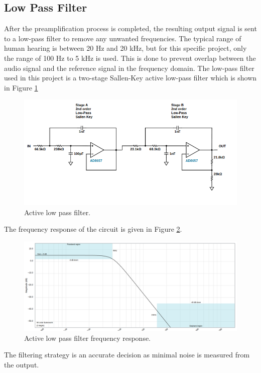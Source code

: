 \documentclass[a4paper,10pt]{IEEEtran}
\begin{document}
\subsection{Low Pass Filter}
After the preamplification process is completed, the resulting output signal is sent to a low-pass filter to remove any unwanted frequencies. The typical range of human hearing is between 20 Hz and 20 kHz, but for this specific project, only the range of 100 Hz to 5 kHz is used. This is done to prevent overlap between the audio signal and the reference signal in the frequency domain. The low-pass filter used in this project is a two-stage Sallen-Key active low-pass filter which is shown in Figure \ref{lowpass}
\begin{figure}[htbp!]
    \centering
    \includegraphics[width = 1\linewidth]{active_low_pass_circuit.png}
    \caption{Active low pass filter.}
    \label{lowpass}
\end{figure} 
The frequency response of the circuit is given in Figure \ref{lowpass_resp}.
\begin{figure}[htbp!]
    \centering
    \includegraphics[width = 1\linewidth]{active_low_pass.png}
    \caption{Active low pass filter frequency response.}
    \label{lowpass_resp}
\end{figure} 
The filtering strategy is an accurate decision as minimal noise is measured from the output. 
\end{document}
